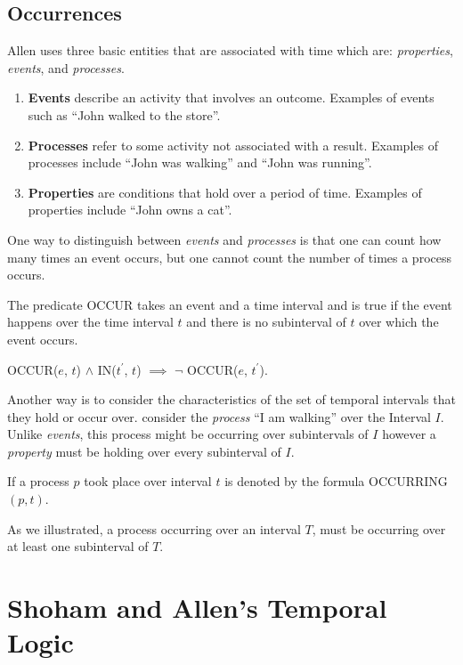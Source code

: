 \subsection{Occurrences}
Allen uses three basic entities that are associated with time which are: \textit{properties}, \textit{events}, and \textit{processes}.
\begin{enumerate}
	\item \textbf{Events} describe an activity that involves an outcome. Examples of events such as ``John walked to the store''.

	\item \textbf{Processes} refer to some activity not associated with a result. Examples of processes include ``John was walking'' and ``John was running''.

	\item \textbf{Properties} are conditions that hold over a period of time. Examples of properties include ``John owns a cat''.
\end{enumerate}
One way to distinguish between \textit{events} and \textit{processes} is that one can count how many times an event occurs, but one cannot count
the number of times a process occurs.


The predicate OCCUR takes an event and a time interval and is true if the event happens over the time interval $t$ and there is no subinterval of $t$
over which the event occurs.

\begin{center}
	OCCUR($e$, $t$) $\land$ IN($t^\prime$, $t$) $\implies$ \(\lnot\) OCCUR($e$, $t^\prime$).
\end{center}

Another way is to consider the characteristics of the set of temporal intervals that they hold or occur over.
consider the \textit{process} ``I am walking'' over the Interval $I$. Unlike \textit{events}, this process might be occurring over subintervals of $I$ however a \textit{property} must be holding over every subinterval of $I$.


If a process $p$ took place over interval $t$ is denoted by the formula OCCURRING$(p,t)$.


As we illustrated, a process occurring over an interval $T$, must be occurring over at least one subinterval of $T$.

\section{Shoham and Allen's Temporal Logic}

